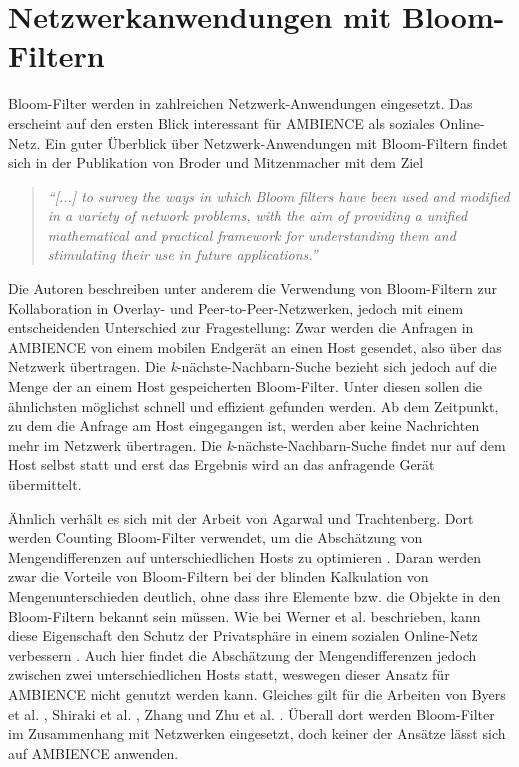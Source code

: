 \section{Netzwerkanwendungen mit Bloom-Filtern}\label{sec:bloom-netzwerk}
Bloom-Filter werden in zahlreichen Netzwerk-Anwendungen eingesetzt. Das erscheint auf den ersten Blick interessant für AMBIENCE als soziales Online-Netz. Ein guter Überblick über Netzwerk-Anwendungen mit Bloom-Filtern findet sich in der Publikation von Broder und Mitzenmacher mit dem Ziel 
\begin{quote}
\textit{"`[...] to survey the ways in which Bloom filters have been used and modified in a variety of network problems, with the aim of providing a unified mathematical and practical framework for understanding them and stimulating their use in future applications."'} \cite{Broder2004}
\end{quote}
Die Autoren beschreiben unter anderem die Verwendung von Bloom-Filtern zur Kollaboration in Overlay- und Peer-to-Peer-Netzwerken, jedoch mit einem entscheidenden Unterschied zur Fragestellung: Zwar werden die Anfragen in AMBIENCE von einem mobilen Endgerät an einen Host gesendet, also über das Netzwerk übertragen. Die \textit{k}-nächste-Nachbarn-Suche bezieht sich jedoch auf die Menge der an einem Host gespeicherten Bloom-Filter. Unter diesen sollen die ähnlichsten möglichst schnell und effizient gefunden werden. Ab dem Zeitpunkt, zu dem die Anfrage am Host eingegangen ist, werden aber keine Nachrichten mehr im Netzwerk übertragen. Die \textit{k}-nächste-Nachbarn-Suche findet nur auf dem Host selbst statt und erst das Ergebnis wird an das anfragende Gerät übermittelt. 

Ähnlich verhält es sich mit der Arbeit von Agarwal und Trachtenberg. Dort werden Counting Bloom-Filter verwendet, um die Abschätzung von Mengendifferenzen auf unterschiedlichen Hosts zu optimieren \cite{Agarwal2006}. Daran werden zwar die Vorteile von Bloom-Filtern bei der blinden Kalkulation von Mengenunterschieden deutlich, ohne dass ihre Elemente bzw. die Objekte in den Bloom-Filtern bekannt sein müssen. Wie bei Werner et al. beschrieben, kann diese Eigenschaft den Schutz der Privatsphäre in einem sozialen Online-Netz verbessern \cite{Werner2015}. Auch hier findet die Abschätzung der Mengendifferenzen jedoch zwischen zwei unterschiedlichen Hosts statt, weswegen dieser Ansatz für AMBIENCE nicht genutzt werden kann. Gleiches gilt für die Arbeiten von Byers et al. \cite{Byers2002}, Shiraki et al. \cite{Shiraki2009}, Zhang \cite{Zhang2012} und Zhu et al. \cite{Zhu2004}. Überall dort werden Bloom-Filter im Zusammenhang mit Netzwerken eingesetzt, doch keiner der Ansätze lässt sich auf AMBIENCE anwenden. 
